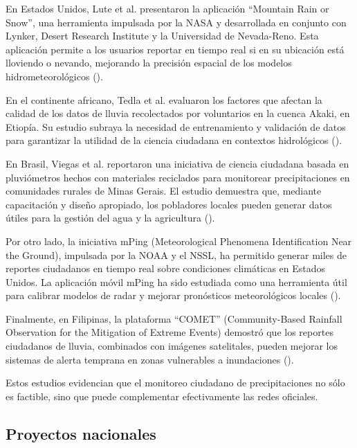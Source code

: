 En Estados Unidos, Lute et al. presentaron la aplicación ``Mountain Rain or Snow'', una herramienta impulsada por la NASA y desarrollada en conjunto con Lynker, Desert Research Institute y la Universidad de Nevada-Reno. Esta aplicación permite a los usuarios reportar en tiempo real si en su ubicación está lloviendo o nevando, mejorando la precisión espacial de los modelos hidrometeorológicos  (\cite{lute2021enhancing}).

En el continente africano, Tedla et al. evaluaron los factores que afectan la calidad de los datos de lluvia recolectados por voluntarios en la cuenca Akaki, en Etiopía. Su estudio subraya la necesidad de entrenamiento y validación de datos para garantizar la utilidad de la ciencia ciudadana en contextos hidrológicos  (\cite{tedla2022evaluation}).

En Brasil, Viegas et al. reportaron una iniciativa de ciencia ciudadana basada en pluviómetros hechos con materiales reciclados para monitorear precipitaciones en comunidades rurales de Minas Gerais. El estudio demuestra que, mediante capacitación y diseño apropiado, los pobladores locales pueden generar datos útiles para la gestión del agua y la agricultura  (\cite{viegas2023citizen}).

Por otro lado, la iniciativa mPing (Meteorological Phenomena Identification Near the Ground), impulsada por la NOAA y el NSSL, ha permitido generar miles de reportes ciudadanos en tiempo real sobre condiciones climáticas en Estados Unidos. La aplicación móvil mPing ha sido estudiada como una herramienta útil para calibrar modelos de radar y mejorar pronósticos meteorológicos locales  (\cite{elmore2014mping}).

Finalmente, en Filipinas, la plataforma ``COMET'' (Community-Based Rainfall Observation for the Mitigation of Extreme Events) demostró que los reportes ciudadanos de lluvia, combinados con imágenes satelitales, pueden mejorar los sistemas de alerta temprana en zonas vulnerables a inundaciones (\cite{okada2019community}).

Estos estudios evidencian que el monitoreo ciudadano de precipitaciones no sólo es factible, sino que puede complementar efectivamente las redes oficiales.


\subsection{Proyectos nacionales}

